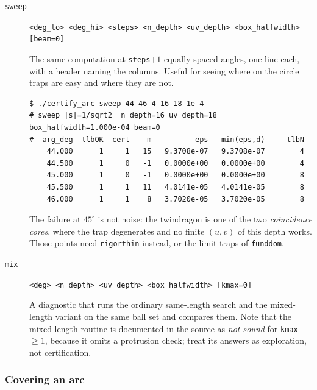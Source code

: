 \documentclass{amsart}
\begin{document}
\begin{description}
\item[\texttt{sweep}] \texttt{<deg\_lo> <deg\_hi> <steps> <n\_depth> <uv\_depth> <box\_halfwidth> [beam=0]}


The same computation at \texttt{steps}$+1$ equally spaced angles, one line each, with a header
naming the columns.  Useful for seeing where on the circle traps are easy and where they are not.
\begin{verbatim}
$ ./certify_arc sweep 44 46 4 16 18 1e-4
# sweep |s|=1/sqrt2  n_depth=16 uv_depth=18 box_halfwidth=1.000e-04 beam=0
#  arg_deg  tlbOK  cert    m          eps   min(eps,d)     tlbN
    44.000      1     1   15   9.3708e-07   9.3708e-07        4
    44.500      1     0   -1   0.0000e+00   0.0000e+00        4
    45.000      1     0   -1   0.0000e+00   0.0000e+00        8
    45.500      1     1   11   4.0141e-05   4.0141e-05        8
    46.000      1     1    8   3.7020e-05   3.7020e-05        8
\end{verbatim}
The failure at $45^\circ$ is not noise: the twindragon is one of the two \emph{coincidence
cores}, where the trap degenerates and no finite $(u,v)$ of this depth works.  Those points need
\texttt{rigorthin} instead, or the limit traps of \texttt{funddom}.
\item[\texttt{mix}] \texttt{<deg> <n\_depth> <uv\_depth> <box\_halfwidth> [kmax=0]}


A diagnostic that runs the ordinary same-length search and the mixed-length variant on the same
ball set and compares them.  Note that the mixed-length routine is documented in the source as
\emph{not sound} for \texttt{kmax} $\ge 1$, because it omits a protrusion check; treat its
answers as exploration, not certification.
\end{description}

\subsubsection{Covering an arc}
\end{document}
